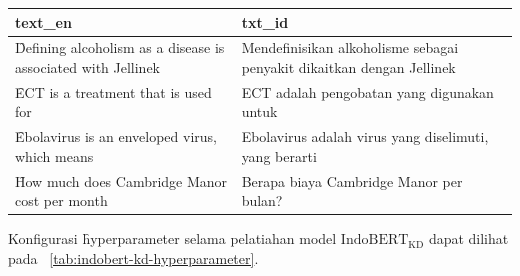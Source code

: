 \begin{table}
    \centering
    \label{tab:sentence-parallel}
    \begin{tabular}{|p{7cm}|p{7cm}|}
        \hline
        \textbf{text\_en} & \textbf{txt\_id} \\
        \hline
        \f{Defining alcoholism as a disease is associated with Jellinek} & Mendefinisikan alkoholisme sebagai penyakit dikaitkan dengan Jellinek \\
        \hline
        \f{ECT is a treatment that is used for} & ECT adalah pengobatan yang digunakan untuk \\
        \hline
        \f{Ebolavirus is an enveloped virus, which means} & Ebolavirus adalah virus yang diselimuti, yang berarti \\
        \hline
        \f{How much does Cambridge Manor cost per month} & Berapa biaya Cambridge Manor per bulan? \\
        \hline
    \end{tabular}
\end{table}

Konfigurasi \f{hyperparameter} selama pelatiahan model $\text{IndoBERT}_{\text{KD}}$ dapat  dilihat pada \tab~\ref{tab:indobert-kd-hyperparameter}.

